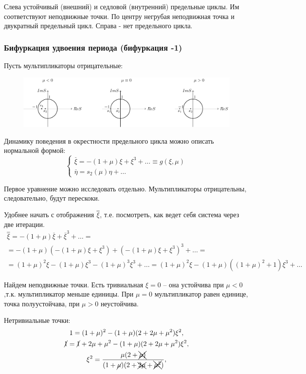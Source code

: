 Слева устойчивый (внешний) и седловой (внутренний) предельные циклы. Им соответствуют неподвижные точки. По центру негрубая неподвижная точка и двукратный предельный цикл. Справа - нет предельного цикла.

\subsubsection{Бифуркация удвоения периода (бифуркация -1)}
Пусть мультипликаторы отрицательные:
\begin{figure}[H]
	\centering
	\includegraphics[width=1\linewidth]{fig/fig67.pdf}   
\end{figure}

Динамику поведения в окрестности предельного цикла можно описать нормальной формой:
\begin{equation}
	\left\{\begin{aligned}
		\stackrel{\_}{\xi}= -(1+\mu)\xi+\xi^3+\dots \equiv g(\xi,\mu)\\
		\stackrel{\_}{\eta}= s_2(\mu)\eta+\dots
	\end{aligned}\right.
	\label{eq:110}	
\end{equation}

Первое уравнение можно исследовать отдельно. Мультипликаторы отрицательны, следовательно, будут перескоки. 

Удобнее начать с отображения $\stackrel{=}{\xi}$, т.е. посмотреть, как ведет себя система через две итерации.
\begin{gather*}
	\stackrel{=}{\xi}=-(1+\mu)\stackrel{\_}{\xi}+\stackrel{\_}{\xi}^3+\dots= \\
	=-(1+\mu)(-(1+\mu)\xi+\xi^3)+(-(1+\mu)\xi+\xi^3)^3+\dots= \\
	=(1+\mu)^2\xi-(1+\mu)\xi^3-(1+\mu)^3\xi^3+\dots=(1+\mu)^2\xi-(1+\mu)((1+\mu)^2+1)\xi^3+\dots
\end{gather*}


Найдем неподвижные точки. Есть тривиальная $\xi=0$ -- она устойчива при $\mu<0$,т.к. мультипликатор меньше единицы. При $\mu=0$ мультипликатор равен единице, точка полуустойчава, при $\mu>0$ неустойчива.

Нетривиальные точки:
\begin{gather*}
	1=(1+\mu)^2-(1+\mu)(2+2\mu+\mu^2)\xi^2, \\
	\cancel{1}=\cancel{1} +2\mu+\mu^2-(1+\mu)(2+2\mu+\mu^2)\xi^2, \\
	\xi^2=\frac{\mu(2+\xcancel{\mu)}}{(1+\cancel{\mu})(2+\xcancel{2\mu}+\xcancel{\mu^2})},
\end{gather*}

